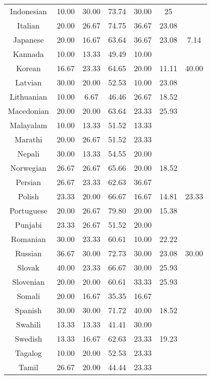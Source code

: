 \begin{table*}[]
\begin{tabular}{c|c|c|cccc}
Indonesian & 10.00 & 30.00 & 73.74 & 30.00 & 25 &  \\
Italian & 20.00 & 26.67 & 74.75 & 36.67 & 23.08 &  \\
Japanese & 20.00 & 16.67 & 63.64 & 36.67 & 23.08 & 7.14 \\
Kannada & 10.00 & 13.33 & 49.49 & 10.00 & \multicolumn{1}{l}{} &  \\
Korean & 16.67 & 23.33 & 64.65 & 20.00 & 11.11 & 40.00 \\
Latvian & 30.00 & 20.00 & 52.53 & 10.00 & 23.08 &  \\
Lithuanian & 10.00 & 6.67 & 46.46 & 26.67 & 18.52 &  \\
Macedonian & 20.00 & 20.00 & 63.64 & 23.33 & 25.93 &  \\
Malayalam & 10.00 & 13.33 & 51.52 & 13.33 & \multicolumn{1}{l}{} &  \\
Marathi & 20.00 & 26.67 & 51.52 & 23.33 & \multicolumn{1}{l}{} &  \\
Nepali & 30.00 & 13.33 & 54.55 & 20.00 & \multicolumn{1}{l}{} &  \\
Norwegian & 26.67 & 26.67 & 65.66 & 20.00 & 18.52 &  \\
Persian & 26.67 & 23.33 & 62.63 & 36.67 & \multicolumn{1}{l}{} &  \\
Polish & 23.33 & 20.00 & 66.67 & 16.67 & 14.81 & 23.33 \\
Portuguese & 20.00 & 26.67 & 79.80 & 20.00 & 15.38 &  \\
Punjabi & 23.33 & 26.67 & 51.52 & 20.00 & \multicolumn{1}{l}{} &  \\
Romanian & 30.00 & 23.33 & 60.61 & 10.00 & 22.22 &  \\
Russian & 36.67 & 30.00 & 72.73 & 30.00 & 23.08 & 30.00 \\
Slovak & 40.00 & 23.33 & 66.67 & 30.00 & 25.93 &  \\
Slovenian & 20.00 & 20.00 & 60.61 & 33.33 & 25.93 &  \\
Somali & 20.00 & 16.67 & 35.35 & 16.67 & \multicolumn{1}{l}{} &  \\
Spanish & 30.00 & 30.00 & 71.72 & 40.00 & 18.52 &  \\
Swahili & 13.33 & 13.33 & 41.41 & 30.00 & \multicolumn{1}{l}{} &  \\
Swedish & 13.33 & 16.67 & 62.63 & 23.33 & 19.23 &  \\
Tagalog & 10.00 & 20.00 & 52.53 & 23.33 & \multicolumn{1}{l}{} &  \\
Tamil & 26.67 & 20.00 & 44.44 & 23.33 & \multicolumn{1}{l}{} &  \\

\end{tabular}
\end{table*}
